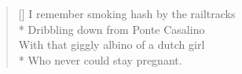 \settowidth{\versewidth}{I remember smoking hash by the railtracks}
\begin{verse}[\versewidth]
I remember smoking hash by the railtracks\\*
\vin Dribbling down from {\sc Ponte Casalino}\\
With that giggly albino of a dutch girl\\*
\vin Who never could stay pregnant.
\end{verse}
